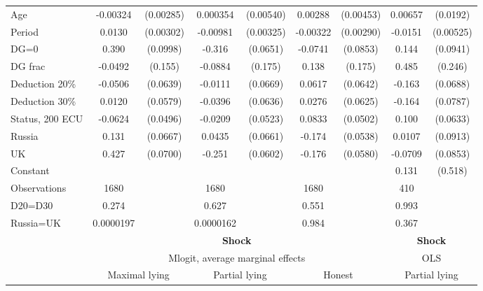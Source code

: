 \begin{tabular}{l|cccccc|cc}
Age             & -0.00324         &(0.00285)& 0.000354         &(0.00540)&  0.00288         &(0.00453)&  0.00657         & (0.0192)\\
Period          &   0.0130\sym{***}&(0.00302)& -0.00981\sym{***}&(0.00325)& -0.00322         &(0.00290)&  -0.0151\sym{***}&(0.00525)\\
DG=0          &    0.390\sym{***}& (0.0998)&   -0.316\sym{***}& (0.0651)&  -0.0741         & (0.0853)&    0.144         & (0.0941)\\
DG frac         &  -0.0492         &  (0.155)&  -0.0884         &  (0.175)&    0.138         &  (0.175)&    0.485\sym{*}  &  (0.246)\\
Deduction 20\%&  -0.0506         & (0.0639)&  -0.0111         & (0.0669)&   0.0617         & (0.0642)&   -0.163\sym{**} & (0.0688)\\
Deduction 30\%&   0.0120         & (0.0579)&  -0.0396         & (0.0636)&   0.0276         & (0.0625)&   -0.164\sym{**} & (0.0787)\\
Status, 200 ECU&  -0.0624         & (0.0496)&  -0.0209         & (0.0523)&   0.0833\sym{*}  & (0.0502)&    0.100         & (0.0633)\\
Russia        &    0.131\sym{**} & (0.0667)&   0.0435         & (0.0661)&   -0.174\sym{***}& (0.0538)&   0.0107         & (0.0913)\\
UK            &    0.427\sym{***}& (0.0700)&   -0.251\sym{***}& (0.0602)&   -0.176\sym{***}& (0.0580)&  -0.0709         & (0.0853)\\
Constant        &                  &         &                  &         &                  &         &    0.131         &  (0.518)\\
\hline
Observations    &     1680         &         &     1680         &         &     1680         &         &      410         &         \\
D20=D30         &    0.274         &         &    0.627         &         &    0.551         &         &    0.993         &         \\
Russia=UK       &0.0000197         &         &0.0000162         &         &    0.984         &         &    0.367         &         \\
\hline\hline
&\multicolumn{6}{c|}{\bf Shock}&\multicolumn{2}{c}{\bf Shock}\\ &\multicolumn{6}{c|}{Mlogit, average marginal effects }&\multicolumn{2}{c}{OLS}\\
                &\multicolumn{2}{c}{Maximal lying}&\multicolumn{2}{c}{Partial lying}&\multicolumn{2}{c|}{Honest}  &\multicolumn{2}{c}{Partial lying}\\

\end{tabular}

